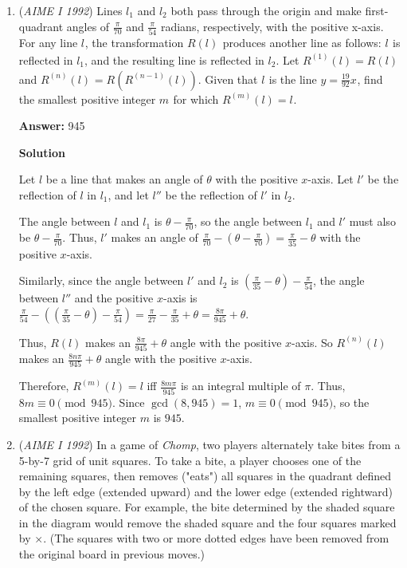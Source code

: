 \begin{enumerate}
 Using either method, we compute the overlapped area to be $200\pi + 400$, and so the area of the intersection of those three graphs is $40^2-(200\pi + 400) \Rightarrow 1200 - 200\pi \approx 571.68$
$\boxed{572}$



	\item (\textit{AIME I 1992}) Lines $l_1^{}$ and $l_2^{}$ both pass through the origin and make first-quadrant angles of $\frac{\pi}{70}$ and $\frac{\pi}{54}$ radians, respectively, with the positive x-axis. For any line $l^{}_{}$, the transformation $R(l)^{}_{}$ produces another line as follows: $l^{}_{}$ is reflected in $l_1^{}$, and the resulting line is reflected in $l_2^{}$. Let $R^{(1)}(l)=R(l)^{}_{}$ and $R^{(n)}(l)^{}_{}=R\left(R^{(n-1)}(l)\right)$. Given that $l^{}_{}$ is the line $y=\frac{19}{92}x^{}_{}$, find the smallest positive integer $m^{}_{}$ for which $R^{(m)}(l)=l^{}_{}$.


 
 \textbf{Answer: }945



\textbf{Solution}

Let $l$ be a line that makes an angle of $\theta$ with the positive $x$-axis. Let $l'$ be the reflection of $l$ in $l_1$, and let $l''$ be the reflection of $l'$ in $l_2$. 

 The angle between $l$ and $l_1$ is $\theta - \frac{\pi}{70}$, so the angle between $l_1$ and $l'$ must also be $\theta - \frac{\pi}{70}$. Thus,  $l'$ makes an angle of $\frac{\pi}{70}-\left(\theta-\frac{\pi}{70}\right) = \frac{\pi}{35}-\theta$ with the positive $x$-axis.  

 Similarly, since the angle between $l'$ and $l_2$ is $\left(\frac{\pi}{35}-\theta\right)-\frac{\pi}{54}$, the angle between $l''$ and the positive $x$-axis is $\frac{\pi}{54}-\left(\left(\frac{\pi}{35}-\theta\right)-\frac{\pi}{54}\right) = \frac{\pi}{27}-\frac{\pi}{35}+\theta = \frac{8\pi}{945} + \theta$. 

 Thus, $R(l)$ makes an $\frac{8\pi}{945} + \theta$ angle with the positive $x$-axis. So $R^{(n)}(l)$ makes an $\frac{8n\pi}{945} + \theta$ angle with the positive $x$-axis. 

 Therefore, $R^{(m)}(l)=l$ iff $\frac{8m\pi}{945}$ is an integral multiple of $\pi$. Thus, $8m \equiv 0\pmod{945}$. Since $\gcd(8,945)=1$, $m \equiv 0 \pmod{945}$, so the smallest positive integer $m$ is $\boxed{945}$. 

 


	\item (\textit{AIME I 1992}) In a game of \textit{Chomp}, two players alternately take bites from a 5-by-7 grid of unit squares. To take a bite, a player chooses one of the remaining squares, then removes ("eats") all squares in the quadrant defined by the left edge (extended upward) and the lower edge (extended rightward) of the chosen square. For example, the bite determined by the shaded square in the diagram would remove the shaded square and the four squares marked by $\times.$ (The squares with two or more dotted edges have been removed from the original board in previous moves.) 



\end{enumerate}
